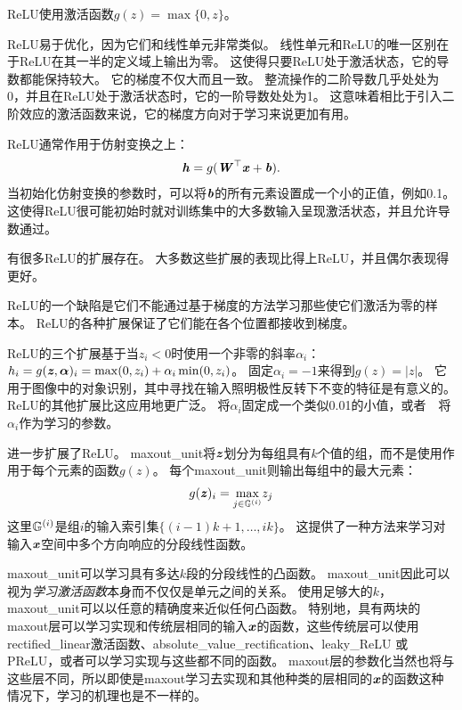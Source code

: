 \gls{ReLU}使用激活函数$g(z)=\max\{0, z\}$。

\gls{ReLU}易于优化，因为它们和线性单元非常类似。
线性单元和\gls{ReLU}的唯一区别在于\gls{ReLU}在其一半的定义域上输出为零。
这使得只要\gls{ReLU}处于激活状态，它的导数都能保持较大。
它的梯度不仅大而且一致。
整流操作的二阶导数几乎处处为0，并且在\gls{ReLU}处于激活状态时，它的一阶导数处处为1。
这意味着相比于引入二阶效应的激活函数来说，它的梯度方向对于学习来说更加有用。

\gls{ReLU}通常作用于仿射变换之上：
\begin{equation}
\boldsymbol{\mathit{h}} = g(\boldsymbol{\mathit{W}}^\top \boldsymbol{\mathit{x}} + \boldsymbol{\mathit{b}}).
\end{equation}
当初始化仿射变换的参数时，可以将$\boldsymbol{\mathit{b}}$的所有元素设置成一个小的正值，例如0.1。
这使得\gls{ReLU}很可能初始时就对训练集中的大多数输入呈现激活状态，并且允许导数通过。

有很多\gls{ReLU}的扩展存在。
大多数这些扩展的表现比得上\gls{ReLU}，并且偶尔表现得更好。

\gls{ReLU}的一个缺陷是它们不能通过基于梯度的方法学习那些使它们激活为零的样本。
\gls{ReLU}的各种扩展保证了它们能在各个位置都接收到梯度。

\gls{ReLU}的三个扩展基于当$z_i<0$时使用一个非零的斜率$\alpha_i$：$h_i =g(\boldsymbol{\mathit{z}}, \boldsymbol{\alpha})_i = \max(0, z_i) + \alpha_i \min(0, z_i)$。
固定$\alpha_i=-1$来得到$g(z)=|z|$。
它用于图像中的对象识别\citep{Jarrett-ICCV2009}，其中寻找在输入照明极性反转下不变的特征是有意义的。
\gls{ReLU}的其他扩展比这应用地更广泛。
\citep{Maas-et-al-ICML2013}将$\alpha_i$固定成一个类似0.01的小值，或者~\textbf{}~将$\alpha_i$作为学习的参数\citep{He-et-al-arxiv2015}。


\citep{Goodfellow_maxout_2013}进一步扩展了\gls{ReLU}。
\gls{maxout_unit}将$\boldsymbol{\mathit{z}}$划分为每组具有$k$个值的组，而不是使用作用于每个元素的函数$g(z)$。
每个\gls{maxout_unit}则输出每组中的最大元素：
\begin{equation}
g(\boldsymbol{\mathit{z}})_i = \underset{j\in \mathbb{G}^{(i)}}{\max} z_j
\end{equation}
这里$\mathbb{G}^{(i)}$是组$i$的输入索引集$\{(i-1)k+1, \ldots, ik\}$。
这提供了一种方法来学习对输入$\boldsymbol{\mathit{x}}$空间中多个方向响应的分段线性函数。

\gls{maxout_unit}可以学习具有多达$k$段的分段线性的凸函数。
\gls{maxout_unit}因此可以视为\emph{学习激活函数}本身而不仅仅是单元之间的关系。
使用足够大的$k$，\gls{maxout_unit}可以以任意的精确度来近似任何凸函数。
特别地，具有两块的maxout层可以学习实现和传统层相同的输入$\boldsymbol{\mathit{x}}$的函数，这些传统层可以使用\gls{rectified_linear}激活函数、\gls{absolute_value_rectification}、\gls{leaky_ReLU} 或\gls{PReLU}，或者可以学习实现与这些都不同的函数。
maxout层的参数化当然也将与这些层不同，所以即使是maxout学习去实现和其他种类的层相同的$\boldsymbol{\mathit{x}}$的函数这种情况下，学习的机理也是不一样的。


